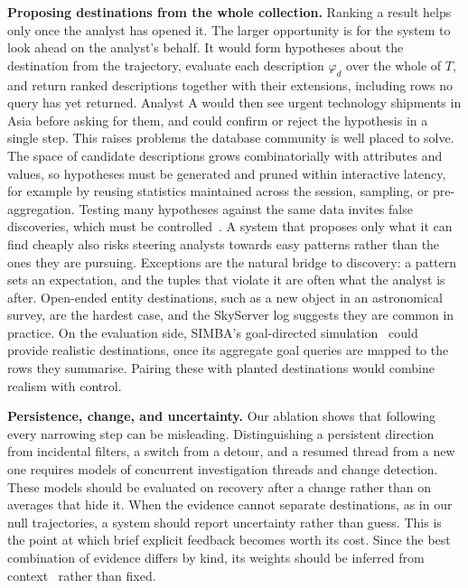 \documentclass[sigconf]{acmart}
\begin{document}
\textbf{Proposing destinations from the whole collection.}
Ranking a result helps only once the analyst has opened it. The larger opportunity is for the system to look ahead on the analyst's behalf. It would form hypotheses about the destination from the trajectory, evaluate each description $\varphi_d$ over the whole of $T$, and return ranked descriptions together with their extensions, including rows no query has yet returned. Analyst A would then see urgent technology shipments in Asia before asking for them, and could confirm or reject the hypothesis in a single step. This raises problems the database community is well placed to solve. The space of candidate descriptions grows combinatorially with attributes and values, so hypotheses must be generated and pruned within interactive latency, for example by reusing statistics maintained across the session, sampling, or pre-aggregation. Testing many hypotheses against the same data invites false discoveries, which must be controlled~\cite{zhao2017controlling}. A system that proposes only what it can find cheaply also risks steering analysts towards easy patterns rather than the ones they are pursuing. Exceptions are the natural bridge to discovery: a pattern sets an expectation, and the tuples that violate it are often what the analyst is after. Open-ended entity destinations, such as a new object in an astronomical survey, are the hardest case, and the SkyServer log suggests they are common in practice. On the evaluation side, SIMBA's goal-directed simulation~\cite{purichAdaptiveBenchmarkModeling2025} could provide realistic destinations, once its aggregate goal queries are mapped to the rows they summarise. Pairing these with planted destinations would combine realism with control.

\textbf{Persistence, change, and uncertainty.}
Our ablation shows that following every narrowing step can be misleading. Distinguishing a persistent direction from incidental filters, a switch from a detour, and a resumed thread from a new one requires models of concurrent investigation threads and change detection. These models should be evaluated on recovery after a change rather than on averages that hide it. When the evidence cannot separate destinations, as in our null trajectories, a system should report uncertainty rather than guess. This is the point at which brief explicit feedback becomes worth its cost. Since the best combination of evidence differs by kind, its weights should be inferred from context~\cite{somechPredictingWhatInteresting2019} rather than fixed.
\end{document}
